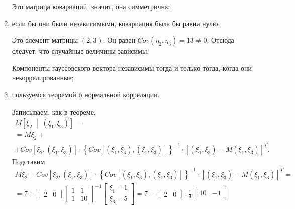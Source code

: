 \begin{enumerate}[label=\alph*)]
  Это матрица ковариаций, значит, она симметрична;
  \item если бы они были независимыми, ковариация была бы равна нулю.

  Это элемент матрицы $ \left( 2, 3 \right) $.
  Он равен $Cov \left( \eta_2, \eta_3 \right) = 13 \neq 0$.
  Отсюда следует, что случайные величины зависимы.

  Компоненты гауссовского вектора независимы тогда и только тогда, когда они некоррелированные;
  \item пользуемся теоремой о нормальной корреляции.

  Записываем, как в теореме,
  \begin{equation*}
    \begin{split}
      M \left[ \xi_2 \; \middle| \; \left( \xi_1, \xi_3 \right) \right] = \\
      = M \xi_2 + \\
      + Cov \left[ \xi_2, \left( \xi_1, \xi_3 \right) \right] \cdot
      \left\{
        Cov \left[ \left( \xi_1, \xi_3 \right), \left( \xi_1, \xi_3 \right) \right]
      \right\}^{-1} \cdot
      \left[ \left( \xi_1, \xi_3 \right) - M \left( \xi_1, \xi_3 \right) \right]^T.
    \end{split}
  \end{equation*}
  Подставим
  \begin{equation*}
    \begin{split}
      M \xi_2 +
      Cov \left[ \xi_2, \left( \xi_1, \xi_3 \right) \right] \cdot
      \left\{
        Cov \left[ \left( \xi_1, \xi_3 \right), \left( \xi_1, \xi_3 \right) \right]
      \right\}^{-1} \cdot
      \left[ \left( \xi_1, \xi_3 \right) - M \left( \xi_1, \xi_3 \right) \right]^T = \\
      = 7 +
      \begin{bmatrix}
        2 & 0
      \end{bmatrix}
      \begin{bmatrix}
        1 & 1 \\
        1 & 10
      \end{bmatrix}^{-1}
      \begin{bmatrix}
        \xi_1 - 1 \\
        \xi_3 - 5
      \end{bmatrix} =
      7 +
      \begin{bmatrix}
        2 & 0
      \end{bmatrix} \cdot \frac{1}{9}
      \begin{bmatrix}
        10 & -1 \\

\end{bmatrix}
\end{split}
\end{equation*}
\end{enumerate}
